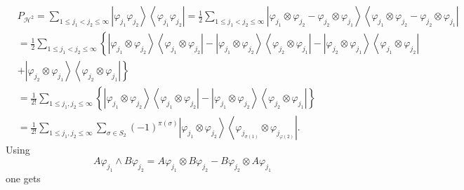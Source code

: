 \documentclass[aps,preprint]{revtex4}%
\begin{document}
\begin{align}
&  P_{\mathcal{H}^{2}}=\sum_{1\leq j_{1}<j_{2}\leq\infty}\left\vert
\varphi_{j_{1}}\varphi_{j_{2}}\right\rangle \left\langle \varphi_{j_{1}%
}\varphi_{j_{2}}\right\vert =\frac{1}{2}\sum_{1\leq j_{1}<j_{2}\leq\infty
}\left\vert \varphi_{j_{1}}\otimes\varphi_{j_{2}}-\varphi_{j_{2}}%
\otimes\varphi_{j_{1}}\right\rangle \left\langle \varphi_{j_{1}}\otimes
\varphi_{j_{2}}-\varphi_{j_{2}}\otimes\varphi_{j_{1}}\right\vert \nonumber\\
&  =\frac{1}{2}\sum_{1\leq j_{1}<j_{2}\leq\infty}\left\{  \left\vert
\varphi_{j_{1}}\otimes\varphi_{j_{2}}\right\rangle \left\langle \varphi
_{j_{1}}\otimes\varphi_{j_{2}}\right\vert -\left\vert \varphi_{j_{1}}%
\otimes\varphi_{j_{2}}\right\rangle \left\langle \varphi_{j_{2}}\otimes
\varphi_{j_{1}}\right\vert -\left\vert \varphi_{j_{2}}\otimes\varphi_{j_{1}%
}\right\rangle \left\langle \varphi_{j_{1}}\otimes\varphi_{j_{2}}\right\vert
\right. \nonumber\\
&  \left.  +\left\vert \varphi_{j_{2}}\otimes\varphi_{j_{1}}\right\rangle
\left\langle \varphi_{j_{2}}\otimes\varphi_{j_{1}}\right\vert \right\}
\nonumber\\
&  =\frac{1}{2!}\sum_{1\leq j_{1},j_{2}\leq\infty}\left\{  \left\vert
\varphi_{j_{1}}\otimes\varphi_{j_{2}}\right\rangle \left\langle \varphi
_{j_{1}}\otimes\varphi_{j_{2}}\right\vert -\left\vert \varphi_{j_{1}}%
\otimes\varphi_{j_{2}}\right\rangle \left\langle \varphi_{j_{2}}\otimes
\varphi_{j_{1}}\right\vert \right\} \nonumber\\
&  =\frac{1}{2!}\sum_{1\leq j_{1},j_{2}\leq\infty}\sum_{\sigma\in S_{2}%
}\left(  -1\right)  ^{\pi\left(  \sigma\right)  }\left\vert \varphi_{j_{1}%
}\otimes\varphi_{j_{2}}\right\rangle \left\langle \varphi_{j_{\sigma\left(
1\right)  }}\otimes\varphi_{j_{\varphi\left(  2\right)  }}\right\vert .
\end{align}
Using%
\begin{equation}
A\varphi_{j_{1}}\wedge B\varphi_{j_{2}}=A\varphi_{j_{1}}\otimes B\varphi
_{j_{2}}-B\varphi_{j_{2}}\otimes A\varphi_{j_{1}}%
\end{equation}
one gets%
\end{document}
